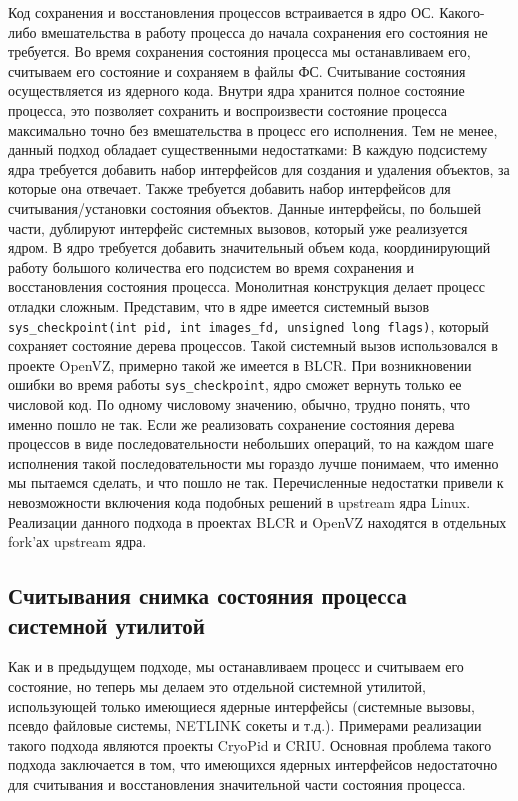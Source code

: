 Код сохранения и восстановления процессов встраивается в ядро ОС. Какого-либо вмешательства в работу процесса до начала сохранения его состояния не требуется. Во время сохранения состояния процесса мы останавливаем его, считываем его состояние и сохраняем в файлы ФС. Считывание состояния осуществляется из ядерного кода. Внутри ядра хранится полное состояние процесса, это позволяет сохранить и воспроизвести состояние процесса максимально точно без вмешательства в процесс его исполнения. Тем не менее, данный подход обладает существенными недостатками:
В каждую подсистему ядра требуется добавить набор интерфейсов для создания и удаления объектов, за которые она отвечает. Также требуется добавить набор интерфейсов для  считывания/установки состояния объектов. Данные интерфейсы, по большей части, дублируют интерфейс системных вызовов, который уже реализуется ядром.
В ядро требуется добавить значительный объем кода, координирующий работу большого количества его подсистем во время сохранения и восстановления состояния процесса.
Монолитная конструкция делает процесс отладки сложным. Представим, что в ядре имеется системный вызов \texttt{sys_checkpoint(int pid, int images_fd, unsigned long flags)}, который сохраняет состояние дерева процессов. Такой системный вызов использовался в проекте OpenVZ, примерно такой же имеется в BLCR. При возникновении ошибки во время работы \texttt{sys_checkpoint}, ядро сможет вернуть только ее числовой код. По одному числовому значению, обычно, трудно понять, что именно пошло не так. Если же реализовать сохранение состояния дерева процессов в виде последовательности небольших операций, то на каждом шаге исполнения такой последовательности мы гораздо лучше понимаем, что именно мы пытаемся сделать, и что пошло не так.
Перечисленные недостатки привели к невозможности включения кода подобных решений в upstream ядра Linux. Реализации данного подхода в проектах BLCR и OpenVZ находятся в отдельных fork’ах upstream ядра.

\subsection{Считывания снимка состояния процесса системной утилитой}
 
Как и в предыдущем подходе, мы останавливаем процесс и считываем его состояние, но теперь мы делаем это отдельной системной утилитой, использующей только имеющиеся ядерные интерфейсы (системные вызовы, псевдо файловые системы, NETLINK сокеты и т.д.). Примерами реализации такого подхода являются проекты CryoPid и CRIU. Основная проблема такого подхода заключается в том, что имеющихся ядерных интерфейсов недостаточно для считывания и восстановления значительной части состояния процесса.
 
